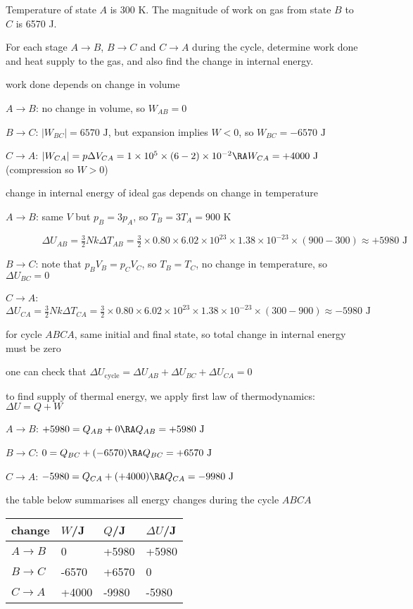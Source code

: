 Temperature of state $A$ is 300 K. The magnitude of work on gas from state $B$ to $C$ is 6570 J.

For each stage $A \to B$, $B \to C$ and $C \to A$ during the cycle, determine work done and heat supply to the gas, and also find the change in internal energy.

\newpage

\sol work done depends on change in volume

$A\to B$: no change in volume, so $W_{AB} = 0$

$B \to C$: $|W_{BC}|= 6570 \text{ J}$, but expansion implies $W<0$, so $W_{BC}=-6570 \text{ J}$

$C \to A$: $|W_{CA}| = p\Delta V_{CA} = 1\times10^5 \times (6-2)\times10^{-2} \RA W_{CA}= +4000 \text{ J}$ (compression so $W>0$)

\noindent change in internal energy of ideal gas depends on change in temperature

$A\to B$: same $V$ but $p_B = 3p_A$, so $T_B = 3T_A = 900 \text{ K}$

$\phantom{A\to B\text{: }}\Delta U_{AB} = \frac{3}{2}Nk\Delta T_{AB} = \frac{3}{2}\times 0.80\times 6.02\times10^{23}\times1.38\times10^{-23}\times(900-300) \approx +5980 \text{ J}$

$B \to C$: note that $p_BV_B = p_CV_C$, so $T_B = T_C$, no change in temperature, so $\Delta U_{BC}=0$

$C \to A$: $\Delta U_{CA} = \frac{3}{2}Nk\Delta T_{CA} = \frac{3}{2}\times 0.80\times 6.02\times10^{23}\times1.38\times10^{-23}\times(300-900) \approx -5980 \text{ J}$


for cycle $ABCA$, same initial and final state, so total change in internal energy must be zero

one can check that $\Delta U_\text{cycle} = \Delta U_{AB} + \Delta U_{BC} + \Delta U_{CA} = 0$
	
\noindent to find supply of thermal energy, we apply first law of thermodynamics: $\Delta U = Q + W$

$A\to B$: $+5980 = Q_{AB} + 0 \RA Q_{AB} = +5980 \text{ J}$

$B \to C$: $0 = Q_{BC} + (-6570) \RA Q_{BC} = +6570 \text{ J}$

$C \to A$: $-5980 = Q_{CA} + (+4000) \RA Q_{CA} = -9980 \text{ J}$

\noindent the table below summarises all energy changes during the cycle $ABCA$
\begin{center}
		\begin{tabular}{|C{2.5cm}|C{2.5cm}|C{2.5cm}|C{2.5cm}|}
			\hline
			change &  $W$/J & $Q$/J & $\Delta U$/J \\ \hline
			$A \to B$ & 0 & +5980 & +5980\\ \hline
			$B \to C$ & -6570 & +6570 & 0 \\ \hline
			$C \to A$ & +4000 & -9980 & -5980 \\ \hline
		\end{tabular}
	
	\vspace*{-0.1\baselineskip}\eoe
\end{center}

